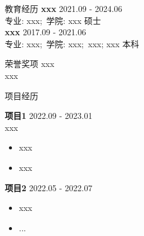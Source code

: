 \documentclass{resume} %
\begin{document}

\begin{rSection}{教育经历}
{\bf xxx}  \hfill {2021.09 - 2024.06} \\
专业: xxx;\ 学院: xxx \hfill{硕士} \\
{\bf xxx} \hfill {2017.09 - 2021.06} \\
专业: xxx;\ 学院: xxx;\ xxx; xxx \hfill{本科}
\end{rSection}


\begin{rSection}{荣誉奖项}
xxx \\
xxx
\end{rSection}


\begin{rSection}{项目经历}


\textbf{项目1} \hfill 2022.09 - 2023.01 \\
xxx
\begin{itemize}
\item xxx
\item xxx
\end{itemize}
\vspace{0.5em}

\textbf{项目2} \hfill 2022.05 - 2022.07
\begin{itemize}
\item xxx
\item ...
\end{itemize}
\vspace{0.5em}
\end{rSection} 

\end{document}
